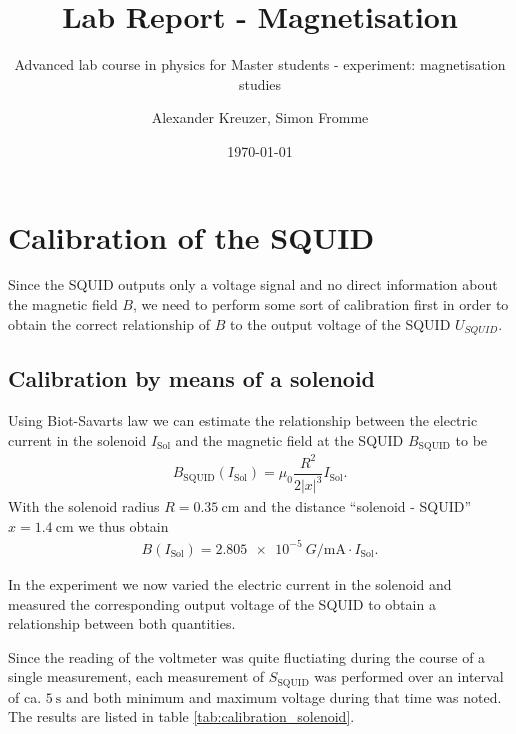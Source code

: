 \documentclass[paper=a4, fontsize=10pt]{scrartcl}
\title{Lab Report - Magnetisation}
\subtitle{Advanced lab course in
  physics for Master students - experiment: magnetisation studies}
\author{Alexander Kreuzer, Simon Fromme}
\date{\normalsize\today}
\begin{document}
\maketitle

\section{Calibration of the SQUID}

Since the SQUID outputs only a voltage signal and no direct
information about the magnetic field $B$, we need to perform some sort
of calibration first in order to obtain the correct relationship of
$B$ to the output voltage of the SQUID $\si{U}_{SQUID}$.

\subsection{Calibration by means of a solenoid}

Using Biot-Savarts law we can estimate the relationship between the
electric current in the solenoid $I_{\mathrm{Sol}}$ and the magnetic
field at the SQUID $B_{\mathrm{SQUID}}$ to be
\begin{align*}
  B_{\mathrm{SQUID}}(I_{\mathrm{Sol}}) = \mu_0 \dfrac{R^2}{2|x|^3} I_{\mathrm{Sol}}.
\end{align*}
With the solenoid radius $R=\SI{0.35}{\cm}$ and the distance ``solenoid
- SQUID'' $x=\SI{1.4}{\cm}$ we thus obtain
\begin{align}
  B(I_{\mathrm{Sol}}) = \SI{2.805e-5}{G\per\m\A} \cdot I_{\mathrm{Sol}}. \label{eq:magnetic-field-squid}
\end{align}
\par

In the experiment we now varied the electric current in the solenoid
and measured the corresponding output voltage of the SQUID to obtain a
relationship between both quantities.

Since the reading of the voltmeter was quite fluctiating during the
course of a single measurement, each measurement of
$S_{\mathrm{SQUID}}$ was performed over an interval of ca.
$\SI{5}{\s}$ and both minimum and maximum voltage during that time was
noted. The results are listed in table \ref{tab:calibration_solenoid}.

\datatable
{}\mytablenew{\datatable}
\end{document}
